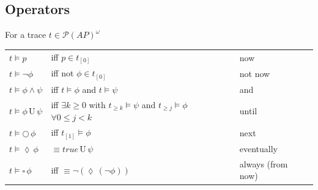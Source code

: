 \documentclass{article}
\def\P{\mathcal{P}}
\def\unt{\, \text{U} \,}
\def\nex{\bigcirc \,}
\def\evt{\lozenge  \,}
\def\alw{\square \,}
\begin{document}
\subsection{Operators}
For a trace $t\in\P(AP)^\omega$
\begin{center}
    \begin{tabular}{l l l}
        $t \vDash p$ & iff $p \in t_{[0]}$ & now \\
        $t \vDash\lnot \phi$ & iff not $\phi \in t_{[0]}$ & not now \\
        $t \vDash \phi \land \psi$ & iff $t \vDash \phi$ and $t \vDash \psi$ & and \\
        $t \vDash \phi \unt \psi$ & iff $\exists k \geq 0$ with  $t_{\geq k} \vDash \psi$ and $t_{\geq j} \vDash \phi$ $\forall 0 \leq j < k$ & until \\
        $t \vDash \nex \phi$ & iff  $t_{[1]} \vDash \phi$ & next \\
        $t \vDash \evt \phi$ & $\equiv true \unt \psi$ & eventually \\
        $t \vDash \alw \phi$ & iff  $\equiv \lnot (\evt (\lnot  \phi))$ & always (from now) \\
    \end{tabular}
\end{center}
\end{document}
